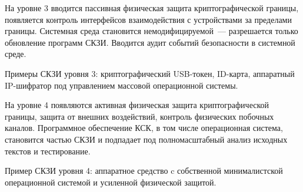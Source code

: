 На уровне 3 вводится пассивная физическая защита криптографической границы,
появляется контроль интерфейсов взаимодействия с устройствами за пределами 
границы. Системная среда становится немодифицируемой~--- разрешается только 
обновление программ СКЗИ. Вводится аудит событий безопасности в системной среде.

Примеры СКЗИ уровня 3: криптографический USB-токен, ID-карта, 
аппаратный IP-шифратор под управлением массовой операционной системы.

На уровне 4 появляются активная физическая защита криптографической границы,
защита от внешних воздействий, 
контроль физических побочных каналов.
%
Программное обеспечение КСК, в том числе операционная система, становится 
частью СКЗИ и подпадает под полномасштабный анализ исходных текстов и 
тестирование. 
%

Пример СКЗИ уровня 4: аппаратное средство c собственной 
минималистской операционной системой и усиленной физической защитой. 

